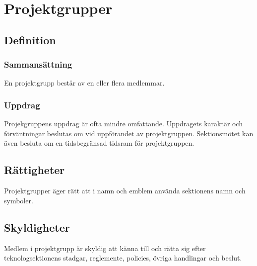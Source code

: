\section{Projektgrupper}

\subsection{Definition}

\subsubsection{Sammansättning}
En projektgrupp består av en eller flera medlemmar.

\subsubsection{Uppdrag}
Projekgruppens uppdrag är ofta mindre omfattande.
Uppdragets karaktär och förväntningar beslutas om vid uppförandet av projektgruppen.
Sektionsmötet kan även besluta om en tidsbegränsad tidsram för projektgruppen.

\subsection{Rättigheter}
Projektgrupper äger rätt att i namn och emblem använda sektionens namn och
symboler.

\subsection{Skyldigheter}
Medlem i projektgrupp är skyldig att känna till och rätta sig efter teknologsektionens stadgar, reglemente, policies, övriga handlingar och beslut.